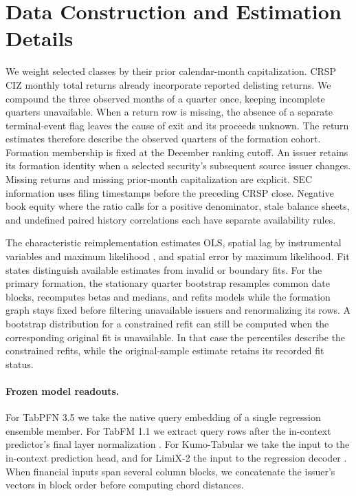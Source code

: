 \section{Data Construction and Estimation Details}
\label{app:data}

We weight selected classes by their prior calendar-month
capitalization. CRSP CIZ monthly total returns already incorporate
reported delisting returns. We compound the three observed months of
a quarter once, keeping incomplete quarters unavailable. When a
return row is missing, the absence of a separate terminal-event
flag leaves the cause of exit and its proceeds unknown. The return estimates
therefore describe the observed quarters of the formation cohort.
Formation membership is fixed at the December ranking cutoff. An
issuer retains its formation identity when a selected security's
subsequent source issuer changes. Missing returns and missing
prior-month capitalization are explicit. SEC information uses filing
timestamps before the preceding CRSP close. Negative book equity
where the ratio calls for a positive denominator, stale balance
sheets, and undefined paired history correlations each have separate
availability rules.

The characteristic reimplementation estimates OLS, spatial lag by
instrumental variables \citep{kelejian1998} and maximum likelihood
\citep{lee2004}, and spatial error by maximum likelihood. Fit states
distinguish available estimates from
invalid or boundary fits. For the primary formation, the stationary
quarter bootstrap resamples common date blocks, recomputes betas and
medians, and refits models while the formation graph stays fixed
before filtering unavailable issuers and renormalizing its rows. A
bootstrap distribution for a constrained refit can still be computed
when the corresponding original fit is unavailable. In that case the
percentiles describe the constrained refits, while the
original-sample estimate retains its recorded fit status.

\paragraph{Frozen model readouts.}
For TabPFN 3.5 we take the native query embedding of a single regression
ensemble member. For TabFM 1.1 we extract query rows after the in-context
predictor's final layer normalization \citep{kong2026tabfm}. For
Kumo-Tabular we take the input to the in-context prediction head, and
for LimiX-2 the input to the regression decoder
\citep{nvidia2026kumo,zhang2026limix}. When financial inputs span several
column blocks, we concatenate the issuer's vectors in block order before
computing chord distances.

